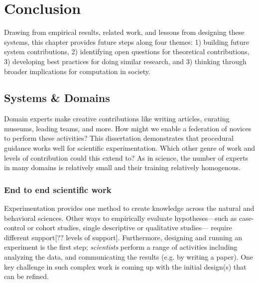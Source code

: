 
\chapter{Conclusion}
Drawing from empirical results, related work, and lessons from designing these systems, this chapter provides future steps along four themes: 1) building future system contributions, 2) identifying open questions for theoretical contributions, 3) developing best practices for doing similar research, and 3) thinking through broader implications for computation in society.

\section{Systems \& Domains} 

Domain experts make creative contributions like writing articles, curating museums, leading teams, and more. How might we enable a federation of novices to perform these activities? This dissertation demonstrates that procedural guidance works well for scientific experimentation. Which other genre of work and levels of contribution could this extend to? As in science, the number of experts in many domains is relatively small and their training relatively homogenous. 

\subsection{End to end scientific work}
Experimentation provides one method to create knowledge across the natural and behavioral sciences. Other ways to empirically evaluate hypotheses---such as case-control or cohort studies, single descriptive or qualitative studies--- require different support[?? levels of support]. Furthermore, designing and running an experiment is the first step; \textit{scientists} perform a range of activities including analyzing the data, and communicating the results (e.g. by writing a paper). One key challenge in such complex work is coming up with the initial design(s) that can be refined. 

